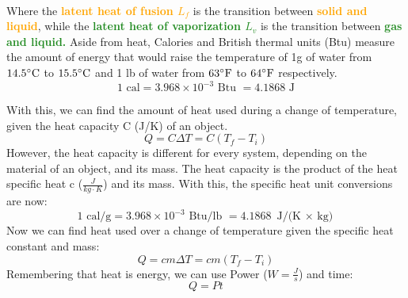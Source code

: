 \documentclass[11pt]{article}
\newcommand{\fahrenheit}{\degree \text{F}}
\begin{document}
        \noindent \\ Where the \textcolor{orange}{\textbf{latent heat of fusion $L_f$}} is the transition between \textcolor{orange}{\textbf{solid and liquid}},
    while the \textcolor{ForestGreen}{\textbf{latent heat of vaporization $L_v$}} is the transition between \textcolor{ForestGreen}{\textbf{gas and liquid.}}
    Aside from heat, Calories and British thermal units (Btu) measure the amount of energy that would raise the temperature of 1g of water
    from $14.5\celsius$ to $15.5\celsius$ and 1 lb of water from $63\fahrenheit$ to $64\fahrenheit$ respectively.
    \begin{equation}
        1 \text{ cal} = 3.968 \times 10^{-3} \text{ Btu }= 4.1868 \text{ J}
    \end{equation}

    \noindent With this, we can find the amount of heat used during a change of temperature,
    given the heat capacity C (J/K) of an object.
    \begin{equation}
        Q = C \Delta T = C(T_f - T_i)
    \end{equation}
    However, the heat capacity is different for every system, depending on the material of an object, and its mass.
    The heat capacity is the product of the heat specific heat c ($\frac{J}{kg \cdot K}$) and its mass.
    With this, the specific heat unit conversions are now:
     \begin{equation}
          1 \text{ cal/g} = 3.968 \times 10^{-3} \text{ Btu/lb }= 4.1868 \text{ J/(K $\times$ kg)}
    \end{equation}
    \noindent Now we can find heat used over a change of temperature given the specific heat constant and mass:
    \begin{equation}
        Q = cm \Delta T = cm(T_f - T_i)
    \end{equation}
    \noindent Remembering that heat is energy, we can use Power ($W = \frac{J}{s}$) and time:
    \begin{equation}
        Q = Pt
    \end{equation}
\end{document}
